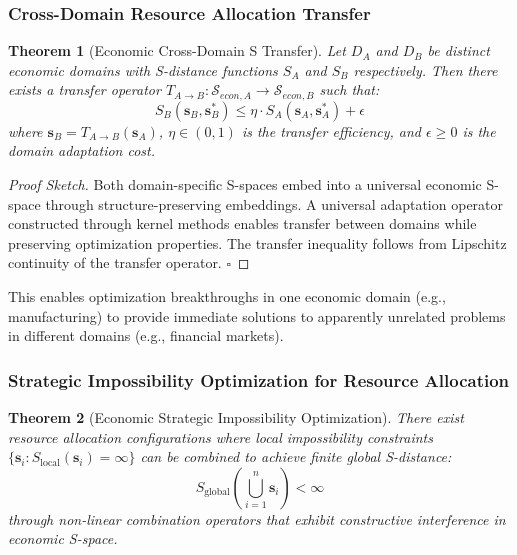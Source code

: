\documentclass[12pt,a4paper]{article}
\newtheorem{theorem}{Theorem}
\begin{document}
\subsubsection{Cross-Domain Resource Allocation Transfer}

\begin{theorem}[Economic Cross-Domain S Transfer]
Let $D_A$ and $D_B$ be distinct economic domains with S-distance functions $S_A$ and $S_B$ respectively. Then there exists a transfer operator $T_{A \to B}: \mathcal{S}_{econ,A} \to \mathcal{S}_{econ,B}$ such that:
\begin{equation}
S_B(\mathbf{s}_B, \mathbf{s}_B^*) \leq \eta \cdot S_A(\mathbf{s}_A, \mathbf{s}_A^*) + \epsilon
\end{equation}
where $\mathbf{s}_B = T_{A \to B}(\mathbf{s}_A)$, $\eta \in (0, 1)$ is the transfer efficiency, and $\epsilon \geq 0$ is the domain adaptation cost.
\end{theorem}

\begin{proof}[Proof Sketch]
Both domain-specific S-spaces embed into a universal economic S-space through structure-preserving embeddings. A universal adaptation operator constructed through kernel methods enables transfer between domains while preserving optimization properties. The transfer inequality follows from Lipschitz continuity of the transfer operator. $\square$
\end{proof}

This enables optimization breakthroughs in one economic domain (e.g., manufacturing) to provide immediate solutions to apparently unrelated problems in different domains (e.g., financial markets).

\subsubsection{Strategic Impossibility Optimization for Resource Allocation}

\begin{theorem}[Economic Strategic Impossibility Optimization]
There exist resource allocation configurations where local impossibility constraints $\{\mathbf{s}_i : S_{\text{local}}(\mathbf{s}_i) = \infty\}$ can be combined to achieve finite global S-distance:
\begin{equation}
S_{\text{global}}\left(\bigcup_{i=1}^n \mathbf{s}_i\right) < \infty
\end{equation}
through non-linear combination operators that exhibit constructive interference in economic S-space.
\end{theorem}
\end{document}

